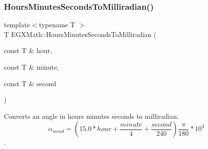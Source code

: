 \mbox{\label{group___e_g_x_math-_angle_conversions-_hours_minutes_seconds_gad78a90abaed52ca9d5fe6b4287c4a5f3}} 
\subsubsection{\texorpdfstring{Hours\+Minutes\+Seconds\+To\+Milliradian()}{HoursMinutesSecondsToMilliradian()}}
{\footnotesize\ttfamily template$<$typename T $>$ \\
T E\+G\+X\+Math\+::\+Hours\+Minutes\+Seconds\+To\+Milliradian (\begin{DoxyParamCaption}\item[{const T \&}]{hour,  }\item[{const T \&}]{minute,  }\item[{const T \&}]{second }\end{DoxyParamCaption})}



Converts an angle in hours minutes seconds to milliradian. \[\alpha_{mrad}=(15.0 * hour + \frac{minute}{4} + \frac{second}{240})\frac{\pi}{180}*10^3\]. 

